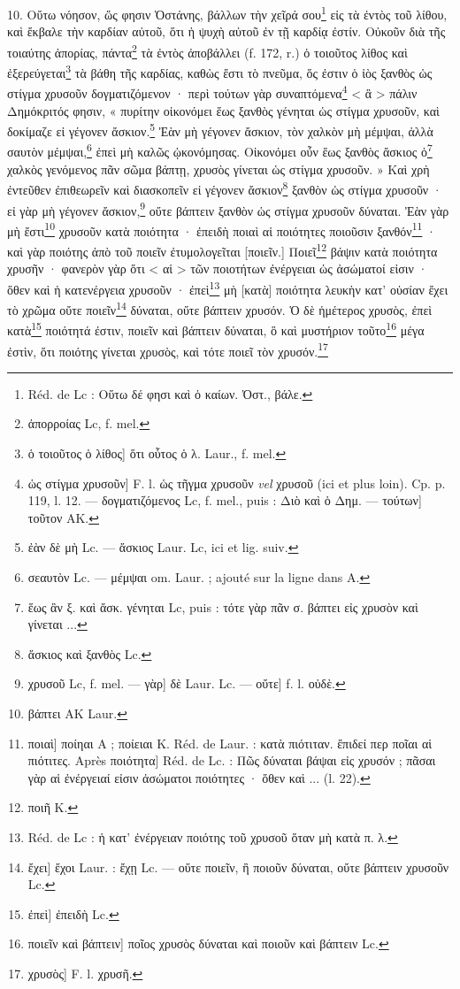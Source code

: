 \documentclass[landscape, a4paper, 11pt, oneside, polutonikogreek, french]{article}
\begin{document}
10. Οὕτω νόησον, ὥς φησιν Ὁστάνης, βάλλων τὴν χεῖρά σου\footnote{Réd. de Lc : Οὕτω δέ φησι καὶ ὁ καίων. Ὀστ., βάλε.} εἰς τὰ ἐντὸς τοῦ λίθου, καὶ ἔκβαλε τὴν καρδίαν αὐτοῦ, ὅτι ἡ ψυχὴ αὐτοῦ ἐν τῇ καρδίᾳ ἐστίν. Οὐκοῦν διὰ τῆς τοιαύτης ἀπορίας, πάντα\footnote{ἀπορροίας Lc, f. mel.} τὰ ἐντὸς ἀποβάλλει (f. 172, r.) ὁ τοιοῦτος λίθος καὶ ἐξερεύγεται\footnote{ὁ τοιοῦτος ὁ λίθος] ὅτι οὗτος ὁ λ. Laur., f. mel.} τὰ βάθη τῆς καρδίας, καθὼς ἔστι τὸ πνεῦμα, ὅς ἐστιν ὁ ἰὸς ξανθὸς ὡς στίγμα χρυσοῦν δογματιζόμενον · περὶ τούτων γὰρ συναπτόμενα\footnote{ὡς στίγμα χρυσοῦν] F. l. ὡς τῆγμα χρυσοῦν \emph{vel} χρυσοῦ (ici et plus loin). Cp. p. 119, l. 12. --- δογματιζόμενος Lc, f. mel., puis : Διὸ καὶ ὁ Δημ. --- τούτων] τοῦτον AK.} < ἃ > πάλιν Δημόκριτός φησιν, « πυρίτην οἰκονόμει ἕως ξανθὸς γένηται ὡς στίγμα χρυσοῦν, καὶ δοκίμαζε εἰ γέγονεν ἄσκιον.\footnote{ἐὰν δὲ μὴ Lc. --- ἄσκιος Laur. Lc, ici et lig. suiv.} Ἐὰν μὴ γέγονεν ἄσκιον, τὸν χαλκὸν μὴ μέμψαι, ἀλλὰ σαυτὸν μέμψαι,\footnote{σεαυτὸν Lc. --- μέμψαι om. Laur. ; ajouté sur la ligne dans A.} ἐπεὶ μὴ καλῶς ᾠκονόμησας. Οἰκονόμει οὖν ἕως ξανθὸς ἄσκιος ὁ\footnote{ἕως ἂν ξ. καὶ ἄσκ. γένηται Lc, puis : τότε γὰρ πᾶν σ. βάπτει εἰς χρυσὸν καὶ γίνεται ...} χαλκὸς γενόμενος πᾶν σῶμα βάπτῃ, χρυσὸς γίνεται ὡς στίγμα χρυσοῦν. » Καὶ χρὴ ἐντεῦθεν ἐπιθεωρεῖν καὶ διασκοπεῖν εἰ γέγονεν ἄσκιον\footnote{ἄσκιος καὶ ξανθὸς Lc.} ξανθὸν ὡς στίγμα χρυσοῦν · εἰ γὰρ μὴ γέγονεν ἄσκιον,\footnote{χρυσοῦ Lc, f. mel. --- γὰρ] δὲ Laur. Lc. --- οὔτε] f. l. οὐδὲ.} οὔτε βάπτειν ξανθὸν ὡς στίγμα χρυσοῦν δύναται. Ἐὰν γὰρ μὴ ἔστι\footnote{βάπτει AK Laur.} χρυσοῦν κατὰ ποιότητα · ἐπειδὴ ποιαὶ αἱ ποιότητες ποιοῦσιν ξανθόν\footnote{ποιαὶ] ποίηαι A ; ποίειαι K. Réd. de Laur. : κατὰ πιότιταν. ἔπιδεί περ ποῖαι αἱ πιότιτες. Après ποιότητα] Réd. de Lc. : Πῶς δύναται βάψαι εἰς χρυσόν ; πᾶσαι γὰρ αἱ ἐνέργειαί εἰσιν ἀσώματοι ποιότητες · ὅθεν καὶ ... (l. 22).} · καὶ γὰρ ποιότης ἀπὸ τοῦ ποιεῖν ἐτυμολογεῖται [ποιεῖν.] Ποιεῖ\footnote{ποιῆ K.} βάψιν κατὰ ποιότητα χρυσῆν · φανερὸν γὰρ ὅτι < αἱ > τῶν ποιοτήτων ἐνέργειαι ὡς ἀσώματοί εἰσιν · ὅθεν καὶ ἡ κατενέργεια χρυσοῦν · ἐπεὶ\footnote{Réd. de Lc : ἡ κατ' ἐνέργειαν ποιότης τοῦ χρυσοῦ ὅταν μὴ κατὰ π. λ.} μὴ [κατὰ] ποιότητα λευκὴν κατ' οὐσίαν ἔχει τὸ χρῶμα οὔτε ποιεῖν\footnote{ἔχει] ἔχοι Laur. : ἔχῃ Lc. --- οὔτε ποιεῖν, ἢ ποιοῦν δύναται, οὔτε βάπτειν χρυσοῦν Lc.} δύναται, οὔτε βάπτειν χρυσόν. Ὁ δὲ ἡμέτερος χρυσὸς, ἐπεὶ κατὰ\footnote{ἐπεὶ] ἐπειδὴ Lc.} ποιότητά ἐστιν, ποιεῖν καὶ βάπτειν δύναται, ὃ καὶ μυστήριον τοῦτο\footnote{ποιεῖν καὶ βάπτειν] ποῖος χρυσὸς δύναται καὶ ποιοῦν καὶ βάπτειν Lc.} μέγα ἐστὶν, ὅτι ποιότης γίνεται χρυσὸς, καὶ τότε ποιεῖ τὸν χρυσόν.\footnote{χρυσὸς] F. l. χρυσῆ.}
\end{document}

